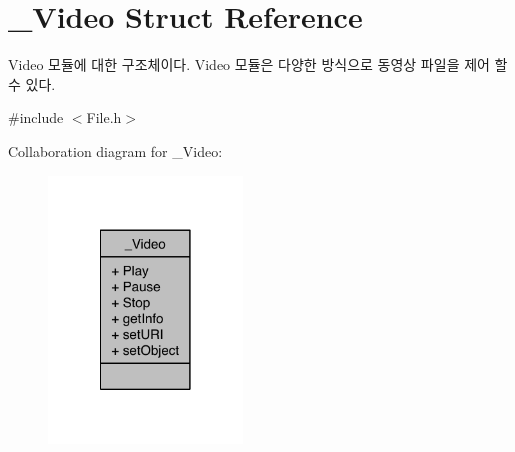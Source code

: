 \hypertarget{struct__Video}{\section{\-\_\-\-Video Struct Reference}
\label{struct__Video}
}


Video 모듈에 대한 구조체이다. Video 모듈은 다양한 방식으로 동영상 파일을 제어 할 수 있다.  




{\ttfamily \#include $<$File.\-h$>$}



Collaboration diagram for \-\_\-\-Video\-:\nopagebreak
\begin{figure}[H]
\begin{center}
\leavevmode
\includegraphics[width=146pt]{d5/da5/struct__Video__coll__graph}
\end{center}
\end{figure}
